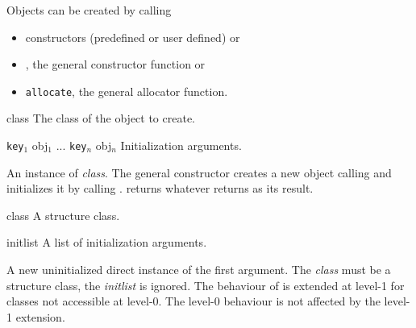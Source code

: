 \begin{optDefinition}
Objects can be created by calling
%
\begin{itemize}
    \item constructors (predefined or user defined) or
    \item {}, the general constructor function or
    \item {\tt allocate}, the general allocator function.
\end{itemize}


%
\begin{arguments}
    \item[class] The class of the object to create.
    \item[{\tt key$_1$} obj$_1$ ... {\tt key$_n$} obj$_n$] Initialization
    arguments.
\end{arguments}
%
\result%
An instance of {\em class}.
%
\remarks%
The general constructor  creates a new object calling
 and initializes it by calling
.  returns whatever
 returns as its result.

%
\begin{arguments}
    \item[class] A structure class.
    \item[initlist] A list of initialization arguments.
\end{arguments}
%
\result%
A new uninitialized direct instance of the first argument.
%
\remarks%
The {\em class\/} must be a structure class, the {\em initlist\/} is ignored.
The behaviour of  is extended at level-1 for classes not
accessible at level-0. The level-0 behaviour is not affected by the
level-1 extension.


\end{optDefinition}

